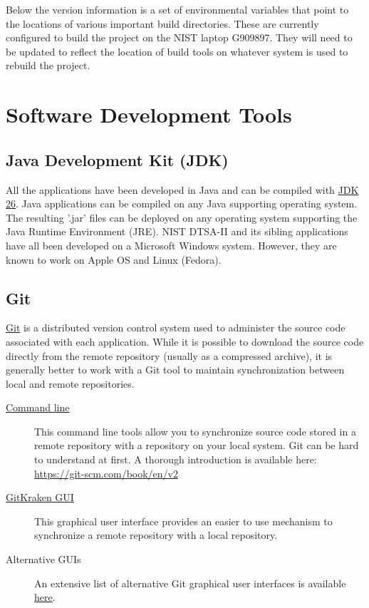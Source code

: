 \documentclass{article}
\begin{document}
Below the version information is a set of environmental variables that point to the locations of various important build directories.  These are currently configured to build the project on the NIST laptop G909897.  They will need to be updated to reflect the location of build tools on whatever system is used to rebuild the project.

\section{Software Development Tools}
\subsection{Java Development Kit (JDK)}
All the applications have been developed in Java and can be compiled with \href{https://adoptium.net/temurin/releases/?os=windows&arch=x64&package=jdk}{JDK 26}.  Java applications can be compiled on any Java supporting operating system.  The resulting '.jar' files can be deployed on any operating system supporting the Java Runtime Environment (JRE). NIST DTSA-II and its sibling applications have all been developed on a Microsoft Windows system.  However, they are known to work on Apple OS and Linux (Fedora).

\subsection{Git}
\href{https://git-scm.com/}{Git} is a distributed version control system used to administer the source code associated with each application.  While it is possible to download the source code directly from the remote repository (usually as a compressed archive), it is generally better to work with a Git tool to maintain synchronization between local and remote repositories.
\begin{description}
    \item[\href{https://git-scm.com/}{Command line}] This command line tools allow you to synchronize source code stored in a remote repository with a repository on your local system.  Git can be hard to understand at first.  A thorough introduction is available here: \url{https://git-scm.com/book/en/v2}
    \item[\href{https://www.gitkraken.com/}{GitKraken GUI}] This graphical user interface provides an easier to use mechanism to synchronize a remote repository with a local repository.
    \item[Alternative GUIs] An extensive list of alternative Git graphical user interfaces is available  \href{https://git-scm.com/downloads/guis}{here}.
\end{description}
\end{document}
